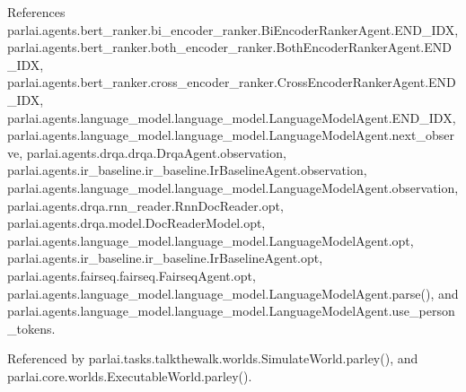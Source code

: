 References parlai.\+agents.\+bert\+\_\+ranker.\+bi\+\_\+encoder\+\_\+ranker.\+Bi\+Encoder\+Ranker\+Agent.\+E\+N\+D\+\_\+\+I\+DX, parlai.\+agents.\+bert\+\_\+ranker.\+both\+\_\+encoder\+\_\+ranker.\+Both\+Encoder\+Ranker\+Agent.\+E\+N\+D\+\_\+\+I\+DX, parlai.\+agents.\+bert\+\_\+ranker.\+cross\+\_\+encoder\+\_\+ranker.\+Cross\+Encoder\+Ranker\+Agent.\+E\+N\+D\+\_\+\+I\+DX, parlai.\+agents.\+language\+\_\+model.\+language\+\_\+model.\+Language\+Model\+Agent.\+E\+N\+D\+\_\+\+I\+DX, parlai.\+agents.\+language\+\_\+model.\+language\+\_\+model.\+Language\+Model\+Agent.\+next\+\_\+observe, parlai.\+agents.\+drqa.\+drqa.\+Drqa\+Agent.\+observation, parlai.\+agents.\+ir\+\_\+baseline.\+ir\+\_\+baseline.\+Ir\+Baseline\+Agent.\+observation, parlai.\+agents.\+language\+\_\+model.\+language\+\_\+model.\+Language\+Model\+Agent.\+observation, parlai.\+agents.\+drqa.\+rnn\+\_\+reader.\+Rnn\+Doc\+Reader.\+opt, parlai.\+agents.\+drqa.\+model.\+Doc\+Reader\+Model.\+opt, parlai.\+agents.\+language\+\_\+model.\+language\+\_\+model.\+Language\+Model\+Agent.\+opt, parlai.\+agents.\+ir\+\_\+baseline.\+ir\+\_\+baseline.\+Ir\+Baseline\+Agent.\+opt, parlai.\+agents.\+fairseq.\+fairseq.\+Fairseq\+Agent.\+opt, parlai.\+agents.\+language\+\_\+model.\+language\+\_\+model.\+Language\+Model\+Agent.\+parse(), and parlai.\+agents.\+language\+\_\+model.\+language\+\_\+model.\+Language\+Model\+Agent.\+use\+\_\+person\+\_\+tokens.



Referenced by parlai.\+tasks.\+talkthewalk.\+worlds.\+Simulate\+World.\+parley(), and parlai.\+core.\+worlds.\+Executable\+World.\+parley().

